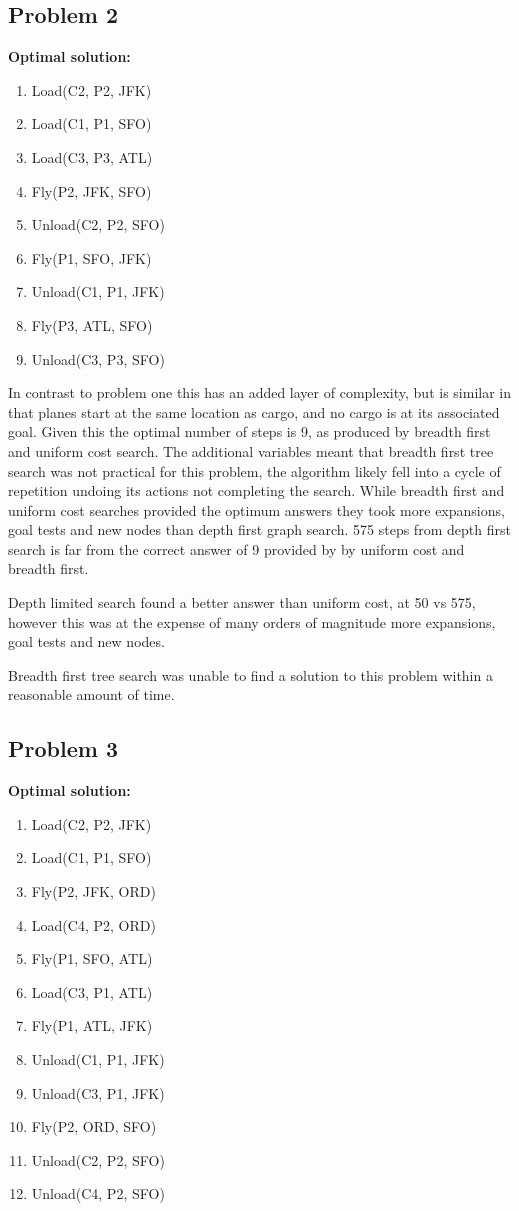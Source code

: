 \documentclass[11pt]{article}
\begin{document}
\subsection{Problem 2}

\textbf{Optimal solution:}
\begin{enumerate}
	\item Load(C2, P2, JFK)
	\item Load(C1, P1, SFO)
	\item Load(C3, P3, ATL)
	\item Fly(P2, JFK, SFO)
	\item Unload(C2, P2, SFO)
	\item Fly(P1, SFO, JFK)
	\item Unload(C1, P1, JFK)
	\item Fly(P3, ATL, SFO)
	\item Unload(C3, P3, SFO)
\end{enumerate}

In contrast to problem one this has an added layer of complexity, but is similar in that planes start at the same location as cargo, and no cargo is at its associated goal. Given this the optimal number of steps is 9, as produced by breadth first and uniform cost search. The additional variables meant that breadth first tree search was not practical for this problem, the algorithm likely fell into a cycle of repetition undoing its actions not completing the search. While breadth first and uniform cost searches provided the optimum answers they took more expansions, goal tests and new nodes than depth first graph search. 575 steps from depth first search is far from the correct answer of 9 provided by by uniform cost and breadth first.

Depth limited search found a better answer than uniform cost, at 50 vs 575, however this was at the expense of many orders of magnitude more expansions, goal tests and new nodes. 

Breadth first tree search was unable to find a solution to this problem within a reasonable amount of time.


\subsection{Problem 3}

\textbf{Optimal solution:}
\begin{enumerate}
	\item Load(C2, P2, JFK)
	\item Load(C1, P1, SFO)
	\item Fly(P2, JFK, ORD)
	\item Load(C4, P2, ORD)
	\item Fly(P1, SFO, ATL)
	\item Load(C3, P1, ATL)
	\item Fly(P1, ATL, JFK)
	\item Unload(C1, P1, JFK)
	\item Unload(C3, P1, JFK)
	\item Fly(P2, ORD, SFO)
	\item Unload(C2, P2, SFO)
	\item Unload(C4, P2, SFO)
\end{enumerate}
\end{document}
